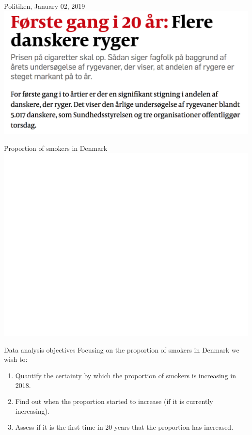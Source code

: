 \documentclass[ignorenonframetext,xcolor=pdflatex,table,dvipsnames,serif]{beamer}
\begin{document}
\begin{frame}{Politiken, January 02, 2019}
\center\includegraphics[scale=0.5]{rygere.png}
\end{frame}

\begin{frame}{Proportion of smokers in Denmark}
\center\includegraphics[scale=0.5]{smokersData}
\end{frame}


\begin{frame}{Data analysis objectives}
  Focusing on the proportion of smokers in Denmark we wish to:
  \begin{enumerate}
    \item{Quantify the certainty by which the proportion of smokers is increasing in 2018.}
	\item{Find out when the proportion started to increase (if it is currently increasing).}
	\item{Assess if it is the first time in 20 years that the proportion has increased.}
  \end{enumerate}	  
\end{frame}
\end{document}
